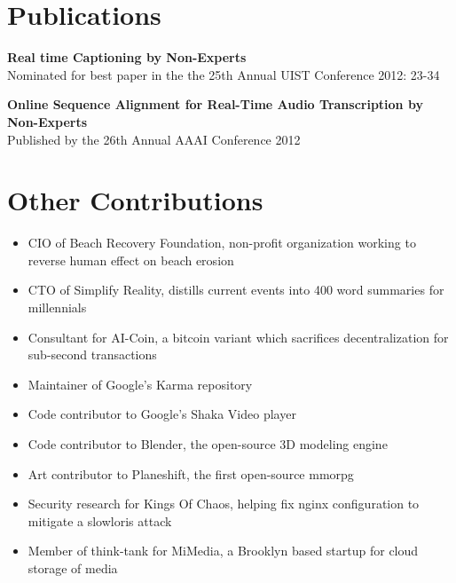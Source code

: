 \documentclass[oneside, final]{scrartcl}
\begin{document}
\begin{center}
\section{Publications}
\begin{flushleft}
\textbf{Real time Captioning by Non-Experts\\}
Nominated for best paper in the the 25th Annual UIST Conference 2012: 23-34\\

\vspace{10pt}

\textbf{Online Sequence Alignment for Real-Time Audio Transcription by Non-Experts \\}
Published by the 26th Annual AAAI Conference 2012\\
\end{flushleft}


\section{Other Contributions}
\begin{itemize}
    \item CIO of Beach Recovery Foundation, non-profit organization working to reverse human effect on beach erosion
    \item CTO of Simplify Reality, distills current events into 400 word summaries for millennials
    \item Consultant for AI-Coin, a bitcoin variant which sacrifices decentralization for sub-second transactions
    \item Maintainer of Google's Karma repository
    \item Code contributor to Google's Shaka Video player
    \item Code contributor to Blender, the open-source 3D modeling engine
    \item Art contributor to Planeshift, the first open-source mmorpg
    \item Security research for Kings Of Chaos, helping fix nginx configuration to mitigate a slowloris attack
    \item Member of think-tank for MiMedia, a Brooklyn based startup for cloud storage of media
\end{itemize}



\end{center}
\end{document}
